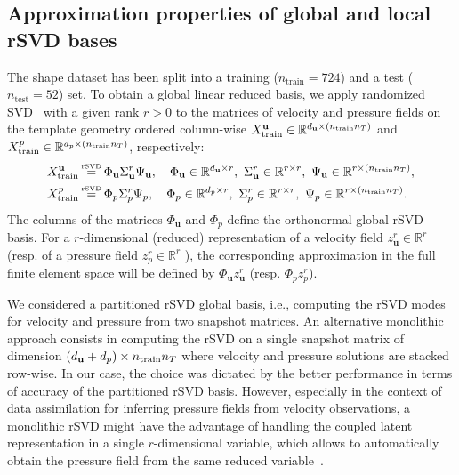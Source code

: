 \subsection{Approximation properties of  global and local rSVD bases}
\label{subsec:sml_rec}
The shape dataset has been split into a  training ($n_{\text{train}}=724$) and a test  ($n_{\text{test}}=52$) set. To obtain a global linear reduced basis, we apply randomized SVD~\cite{halko2011finding} with a given rank $r>0$ to the matrices of velocity and pressure fields on the template geometry ordered column-wise $X^{\mathbf u}_{\text{train}}\in\mathbb{R}^{d_{\mathbf u}\times(n_{\text{train}}n_T)}$ and $X^{p}_{\text{train}}\in\mathbb{R}^{d_p\times(n_{\text{train}}n_T)}$, respectively: 
\begin{equation*}
\begin{aligned}
X^{\mathbf u}_{\text{train}} \ &\rsvd\  \Phi_{\mathbf u}\Sigma^{r}_{\mathbf u}\Psi_{\mathbf u}
,\quad \Phi_{\mathbf u} \in\mathbb{R}^{\dofu\times r},\ \Sigma^{r}_{\mathbf u}\in\mathbb{R}^{r\times r},\ \Psi_{\mathbf u}\in\mathbb{R}^{r\times (n_{\text{train}}n_T)},\\
%
X^{p}_{\text{train}} \ &\rsvd\  \Phi_p\Sigma^{r}_p\Psi_p,\quad \Phi_p\in\mathbb{R}^{\dofp\times r},\ \Sigma^{r}_p\in\mathbb{R}^{r\times r},\ \Psi_p\in\mathbb{R}^{r\times (n_{\text{train}}n_T)}.
\end{aligned}
\end{equation*}
The columns of the matrices $\Phi_{\mathbf u}$ and $\Phi_p$ define the orthonormal global rSVD basis. For a $r$-dimensional (reduced) representation of a velocity field
$z_{\mathbf u}^{r} \in \mathbb R^r$ (resp. of a pressure field $z_p^{r}\in\mathbb{R}^r$ ), the corresponding approximation in the full finite element space will be defined by $\Phi_{\mathbf u} z_{\mathbf u}^{r}$ (resp. $\Phi_p z_p^{r}$).


\begin{rmk}
 We considered a partitioned rSVD global basis, i.e., computing the rSVD modes for velocity and pressure from two snapshot matrices. An alternative monolithic approach consists in 
computing the rSVD on a single snapshot matrix of dimension $(d_{\mathbf u}+d_p) \times n_{\rm train} n_T$ where velocity and pressure solutions are stacked row-wise.
%
In our case, the choice was dictated by the better performance in terms of accuracy of the partitioned rSVD basis.
%
However, especially in the context of data assimilation for inferring pressure fields from velocity observations, a monolithic rSVD might have the advantage of handling the coupled latent representation in a single $r$-dimensional variable, which allows to automatically obtain the pressure field from the same reduced variable~\cite{galarce2023displacement}. 
\end{rmk}

